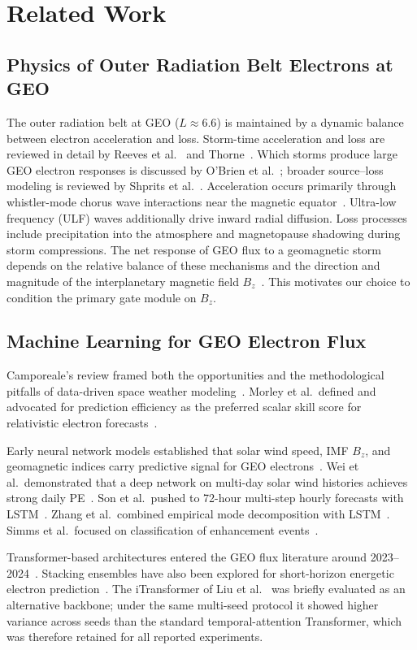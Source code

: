 \documentclass{ieeeaccess}
\begin{document}
\section{Related Work}
\label{sec:related}

\subsection{Physics of Outer Radiation Belt Electrons at GEO}
The outer radiation belt at GEO (\(L\approx6.6\)) is maintained by a dynamic
balance between electron acceleration and loss. Storm-time acceleration and loss
are reviewed in detail by Reeves et al.~\cite{b17} and Thorne~\cite{b18}. Which
storms produce large GEO electron responses is discussed by O'Brien et
al.~\cite{b19}; broader source--loss modeling is reviewed by Shprits et
al.~\cite{b20}. Acceleration occurs primarily through whistler-mode chorus wave
interactions near the magnetic equator~\cite{b2,b3,b6}. Ultra-low frequency (ULF)
waves additionally drive inward radial diffusion. Loss processes include
precipitation into the atmosphere and magnetopause shadowing during storm
compressions. The net response of GEO flux to a geomagnetic storm depends on the
relative balance of these mechanisms and the direction and magnitude of the
interplanetary magnetic field \(B_z\)~\cite{b2}. This motivates our choice to
condition the primary gate module on \(B_z\).

\subsection{Machine Learning for GEO Electron Flux}
Camporeale's review framed both the opportunities and the methodological pitfalls
of data-driven space weather modeling~\cite{b21}. Morley et al.\ defined and
advocated for prediction efficiency as the preferred scalar skill score for
relativistic electron forecasts~\cite{b22}.

Early neural network models established that solar wind speed, IMF \(B_z\), and
geomagnetic indices carry predictive signal for GEO electrons~\cite{b7}. Wei et
al.\ demonstrated that a deep network on multi-day solar wind histories achieves
strong daily PE~\cite{b8}. Son et al.\ pushed to 72-hour multi-step hourly
forecasts with LSTM~\cite{b9}. Zhang et al.\ combined empirical mode decomposition
with LSTM~\cite{b10}. Simms et al.\ focused on classification of enhancement
events~\cite{b11}.

Transformer-based architectures entered the GEO flux literature around
2023--2024~\cite{b14,b15,b16}. Stacking ensembles have also been explored for
short-horizon energetic electron prediction~\cite{b23}. The iTransformer of Liu
et al.~\cite{b24} was briefly evaluated as an alternative backbone; under the same
multi-seed protocol it showed higher variance across seeds than the standard
temporal-attention Transformer, which was therefore retained for all reported
experiments.
\end{document}
